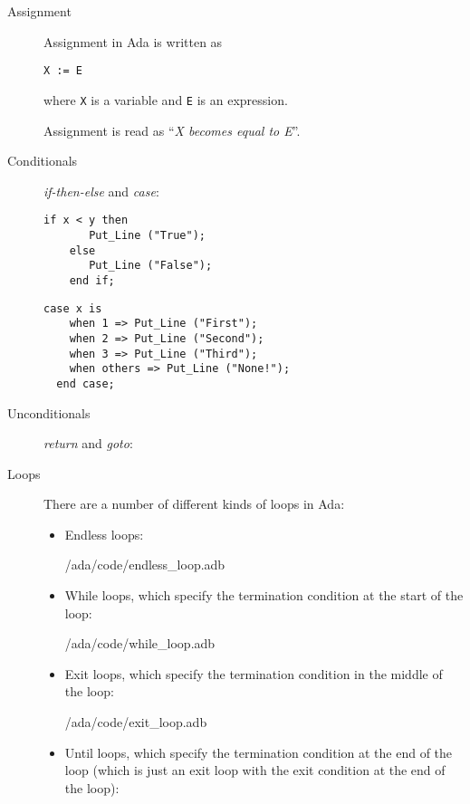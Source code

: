   \begin{description}
    \item[Assignment] 

  Assignment in Ada is written as

 \texttt{X := E}

  where \texttt{X} is a variable and \texttt{E} is an expression.

   Assignment is read as ``{\em X becomes equal to E}''. 

  \item[Conditionals] {\em if-then-else} and {\em case}:

   \begin{lstlisting}[caption={A conditional}]
    if x < y then
       Put_Line ("True");
    else
       Put_Line ("False");
    end if;
  \end{lstlisting}

   \begin{lstlisting}[caption={A case statement}]
  case x is
    when 1 => Put_Line ("First");
    when 2 => Put_Line ("Second");
    when 3 => Put_Line ("Third");
    when others => Put_Line ("None!");
  end case;
  \end{lstlisting}

    \item[Unconditionals] {\em return} and {\em goto}:

    

    


    \item[Loops] There are a number of different kinds of loops in
      Ada:

      \begin{itemize}
        \item Endless loops:

         {\rootdir/ada/code/endless_loop.adb}


        \item While loops, which specify the termination condition at the start of the loop:

 {\rootdir/ada/code/while_loop.adb}
        \item Exit loops, which specify the termination condition in the middle of the loop:

 {\rootdir/ada/code/exit_loop.adb}
        \item Until loops, which specify the termination condition at the end of the loop (which is just an exit loop with the exit condition at the end of the loop):


\end{itemize}
\end{description}
